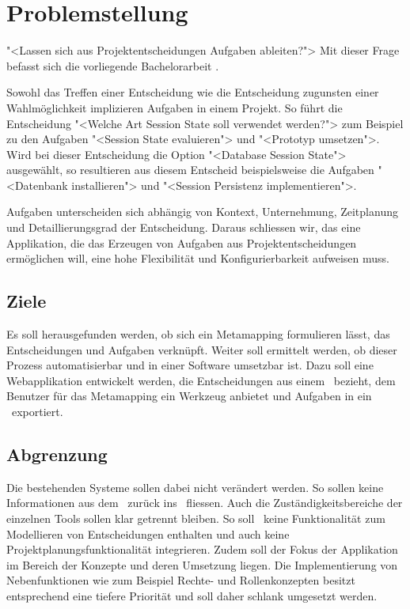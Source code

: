 \chapter{Problemstellung}
	"<Lassen sich aus Projektentscheidungen Aufgaben ableiten?">
	Mit dieser Frage befasst sich die vorliegende Bachelorarbeit \eeppi.
		
	Sowohl das Treffen einer Entscheidung wie die Entscheidung zugunsten einer Wahlmöglichkeit implizieren Aufgaben in einem Projekt.
	So führt die Entscheidung "<Welche Art Session State soll verwendet werden?"> zum Beispiel zu den Aufgaben
	"<Session State evaluieren"> und "<Prototyp umsetzen">.		
	Wird bei dieser Entscheidung die Option "<Database Session State"> ausgewählt,
	so resultieren aus diesem Entscheid beispielsweise die Aufgaben "<Datenbank installieren"> und "<Session Persistenz implementieren">.
	
	Aufgaben unterscheiden sich abhängig von Kontext, Unternehmung, Zeitplanung und Detaillierungsgrad der Entscheidung.
	Daraus schliessen wir, das eine Applikation, die das Erzeugen von Aufgaben aus Projektentscheidungen ermöglichen will, eine hohe Flexibilität und Konfigurierbarkeit aufweisen muss.
	
	
	\section{Ziele}
	Es soll herausgefunden werden, ob sich ein Metamapping formulieren lässt,
	das Entscheidungen und Aufgaben verknüpft.
	Weiter soll ermittelt werden, ob dieser Prozess automatisierbar und in einer Software umsetzbar ist.
	Dazu soll eine Webapplikation entwickelt werden, die Entscheidungen aus einem \dks\ bezieht, 
	dem Benutzer für das Metamapping ein Werkzeug anbietet und Aufgaben in ein \ppt\ exportiert.
	
	
	\section{Abgrenzung}
	Die bestehenden Systeme sollen dabei nicht verändert werden. So sollen keine Informationen aus dem \ppt\ zurück ins \dks\ fliessen.
	Auch die Zuständigkeitsbereiche der einzelnen Tools sollen klar getrennt bleiben.
	So soll \eeppi\ keine Funktionalität zum Modellieren von Entscheidungen enthalten und auch keine Projektplanungsfunktionalität integrieren.
	Zudem soll der Fokus der Applikation im Bereich der Konzepte und deren Umsetzung liegen. Die Implementierung von Nebenfunktionen wie zum Beispiel Rechte- und Rollenkonzepten besitzt entsprechend eine tiefere Priorität und soll daher schlank umgesetzt werden.
	
